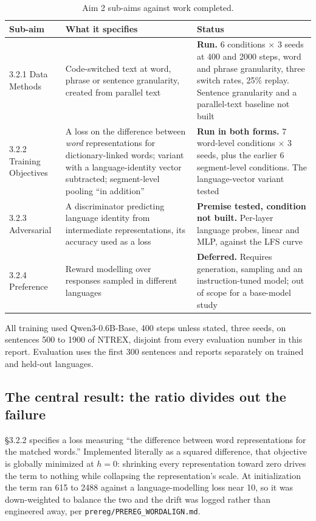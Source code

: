 \documentclass[11pt,a4paper]{article}
\begin{document}
\begin{table}[H]
\centering
\small
\caption{Aim 2 sub-aims against work completed.}
\begin{tabular}{p{2.4cm}p{5.4cm}p{6.4cm}}
\toprule
Sub-aim & What it specifies & Status \\
\midrule
3.2.1 Data Methods & Code-switched text at word, phrase or sentence
granularity, created from parallel text &
\textbf{Run.} 6 conditions $\times$ 3 seeds at 400 and 2000 steps, word and phrase
granularity, three switch rates, 25\% replay. Sentence granularity and a
parallel-text baseline not built \\[2pt]
3.2.2 Training Objectives & A loss on the difference between
\emph{word} representations for dictionary-linked words; variant with a
language-identity vector subtracted; segment-level pooling ``in addition'' &
\textbf{Run in both forms.} 7 word-level conditions $\times$ 3 seeds, plus the
earlier 6 segment-level conditions. The language-vector variant tested \\[2pt]
3.2.3 Adversarial & A discriminator predicting language identity from
intermediate representations, its accuracy used as a loss &
\textbf{Premise tested, condition not built.} Per-layer language probes, linear
and MLP, against the LFS curve \\[2pt]
3.2.4 Preference & Reward modelling over responses sampled in different
languages & \textbf{Deferred.} Requires generation, sampling and an
instruction-tuned model; out of scope for a base-model study \\
\bottomrule
\end{tabular}
\end{table}

All training used Qwen3-0.6B-Base, 400 steps unless stated, three seeds, on
sentences 500 to 1900 of NTREX, disjoint from every evaluation number in this
report. Evaluation uses the first 300 sentences and reports separately on
trained and held-out languages.

\subsection{The central result: the ratio divides out the failure}
\label{sec:ratiofail}
\S3.2.2 specifies a loss measuring ``the difference between word
representations for the matched words.'' Implemented literally as a squared
difference, that objective is globally minimized at $h = 0$: shrinking every
representation toward zero drives the term to nothing while collapsing the
representation's scale. At initialization the term ran 615 to 2488 against a
language-modelling loss near 10, so it was down-weighted to balance the two
and the drift was logged rather than engineered away, per
\texttt{prereg/PREREG\_WORDALIGN.md}.
\end{document}
